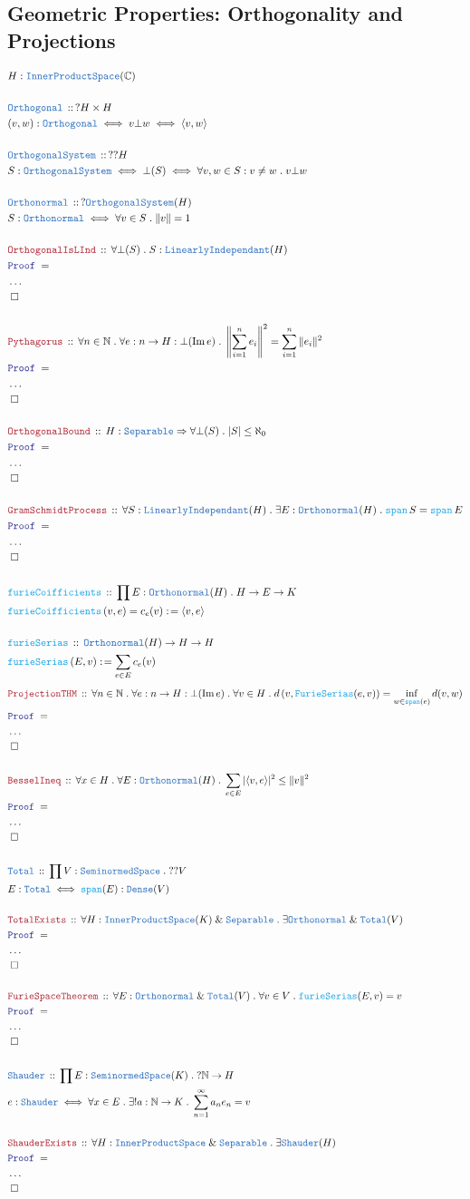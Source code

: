 \documentclass[12pt]{scrartcl}
\newcommand{\TYPE}[1]{\textcolor{NavyBlue}{\mathtt{#1}}}
\newcommand{\FUNC}[1]{\textcolor{Cerulean}{\mathtt{#1}}}
\newcommand{\LOGIC}[1]{\textcolor{Blue}{\mathtt{#1}}}
\newcommand{\THM}[1]{\textcolor{Maroon}{\mathtt{#1}}}
\renewcommand{\.}{\; . \;}
\newcommand{\de}{: \kern 0.1pc =}
\newcommand{\Act}[1]{\left( #1 \right)}
\newcommand{\Theorem}[2]{& \THM{#1} \, :: \, #2 \\ & \Proof = \\ }
\newcommand{\DeclareType}[2]{& \TYPE{#1} \, :: \, #2 \\}
\newcommand{\DefineType}[3]{& #1 : \TYPE{#2} \iff #3 \\}
\newcommand{\DefineNamedType}[4]{& #1 : \TYPE{#2} \iff #3 \iff #4 \\}
\newcommand{\DeclareFunc}[2]{& \FUNC{#1} \, :: \, #2 \\}
\newcommand{\DefineFunc}[3]{&  \FUNC{#1}\Act{#2} \de #3 \\}
\newcommand{\DefineNamedFunc}[4]{&  \FUNC{#1}\Act{#2} = #3 \de #4 \\}
\newcommand{\Page}[1]{\begin{align*} #1 \end{align*} \newpage   }
\newcommand{\NoProof}{ & \ldots \\ \EndProof}
\renewcommand{\And}{\; \& \;}
\newcommand{\Nat}{\mathbb{N} }
\newcommand{\QED}{\; \square}
\newcommand{\EndProof}{& \QED \\}
\newcommand{\Proof}{\LOGIC{Proof} \; }
\newcommand{\Sep}{\TYPE{Separable}}
\newcommand{\SNS}{\TYPE{SeminormedSpace}}
\newcommand{\IPS}{\TYPE{InnerProductSpace}}
\begin{document}
\subsection{Geometric Properties: Orthogonality and Projections}
\Page{
   & H : \IPS(\mathbb{C}) \\
   \\
  \DeclareType{Orthogonal}{? H \times H}
  \DefineNamedType{ (v,w) }{Orthogonal}{v \bot w}{ \langle v, w \rangle}
  \\
  \DeclareType{OrthogonalSystem}{ ??H }
  \DefineNamedType{S}{OrthogonalSystem}{\bot(S)}{ \forall v,w \in S : v \neq w \. v \bot w}
  \\
  \DeclareType{Orthonormal}{?\TYPE{OrthogonalSystem}(H)}
  \DefineType{S}{Orthonormal}{ \forall v \in S \. \| v \| = 1 }
  \\
  \Theorem{OrthogonalIsLInd}{\forall \bot(S) \. S : \TYPE{LinearlyIndependant}(H) }
  \NoProof
  \\
  \Theorem{Pythagorus}{\forall n \in \Nat \. \forall e : n \to  H : \bot( \mathrm{Im} \,  e)
  \.  \left\| \sum^n_{i = 1} e_i \right\|^2 = \sum^n_{i = 1} \| e_i \|^2  
  }
  \NoProof
  \\
  \Theorem{OrthogonalBound}{ H : \TYPE{Separable} \Rightarrow \forall \bot(S) \. |S| \le \aleph_0 }
  \NoProof
  \\
  \Theorem{GramSchmidtProcess}{ \forall S : \TYPE{LinearlyIndependant}(H) 
     \. \exists E : \TYPE{Orthonormal}(H)  \.  \FUNC{span} \, S = \FUNC{span} \, E   
   }
   \NoProof
  \\
  \DeclareFunc{furieCoifficients}{ \prod E : \TYPE{Orthonormal}(H) \. H \to E \to K    }
  \DefineNamedFunc{furieCoifficients}{v,e}{ c_e(v)}{ \langle v, e \rangle }
  \\
  \DeclareFunc{furieSerias}{ \TYPE{Orthonormal}(H) \to H \to H }
  \DefineFunc{furieSerias}{ E, v }{ \sum_{e \in E} c_{e}(v)  } 
  }
\Page{
  \Theorem{ProjectionTHM}{ \forall n \in \Nat \. \forall e : n \to H : \bot(\mathrm{Im} \, e) 
  \. \forall v \in H \.  d\left(v, \FUNC{FurieSerias}(e,v) \right) = 
  \inf_{w \in \FUNC{span}(e)} d(v,w) }  
  \NoProof
  \\
  \Theorem{BesselIneq}{ \forall x \in H \. \forall E : \TYPE{Orthonormal}(H)
  \. \sum_{e \in E} | \langle v, e \rangle |^2 \le \| v \|^2
  }
  \NoProof  
  \\
  \DeclareType{Total}{ \prod V : \SNS \. ??V}
  \DefineType{E}{Total}{ \FUNC{span}(E) : \TYPE{Dense}(V)}
  \\
  \Theorem{TotalExists}{ \forall H : \IPS(K) \And \TYPE{Separable} \. 
   \exists  \TYPE{Orthonormal} \And \TYPE{Total}(V)  
  }
  \NoProof
  \\
  \Theorem{FurieSpaceTheorem}{\forall E : \TYPE{Orthonormal} \And \TYPE{Total}(V)
  \.   \forall v \in  V \. \FUNC{furieSerias}(E,v) = v  
  }
  \NoProof
  \\
  \DeclareType{Shauder}{ \prod E : \SNS(K) \.? \Nat \to H}
  \DefineType{e}{Shauder}{ \forall x \in E \. \exists! a : \Nat \to K \. \sum^\infty_{n = 1} 
  a_n e_n = v  
   }
  \\ 
  \Theorem{ShauderExists}{ \forall H : \IPS \And \Sep \. \exists \TYPE{Shauder}(H)}
  \NoProof
}
\newpage
\end{document}
